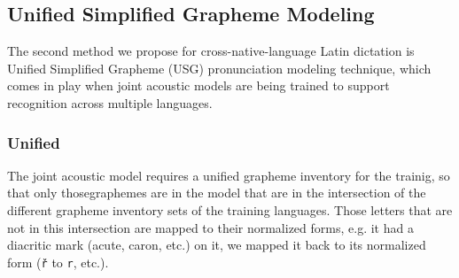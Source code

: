 \documentclass[runningheads,a4paper]{llncs}
\begin{document}
\subsection{Unified Simplified Grapheme Modeling}\label{usg}
The second method we propose for cross-native-language Latin dictation is Unified Simplified Grapheme (USG) pronunciation modeling technique, which comes in play when joint acoustic models are being trained to support recognition across multiple languages.
\subsubsection{Unified}
The joint acoustic model requires a unified grapheme inventory for the trainig, so that only thosegraphemes are in the model that are in the intersection of the different grapheme inventory sets of the training languages.
Those letters that are not in this intersection are mapped to their normalized forms, e.g. it had a diacritic mark (acute, caron, etc.) on it, we mapped it back to its normalized form (\texttt{\v{r}} to \texttt{r}, etc.).
\end{document}
